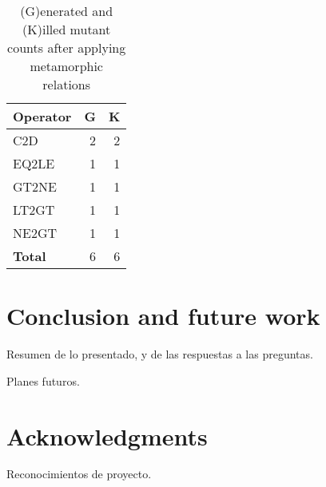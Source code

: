 \begin{table}
    \centering
    \begin{tabular}{lrr}
    \toprule
    \textbf{Operator} & \textbf{G} &  \textbf{K} \\
    \midrule
C2D         & 2 & 2 \\
EQ2LE   & 1     & 1 \\
GT2NE   & 1     & 1 \\
LT2GT   & 1     & 1 \\
NE2GT   & 1     & 1 \\

    \midrule
    \textbf{Total} & 6 & 6  \\
    \bottomrule
    \end{tabular}
    \caption{(G)enerated and (K)illed mutant counts after applying metamorphic relations}
    \label{tab:mutant-counts2}
\end{table}






\section{Conclusion and future work}

Resumen de lo presentado, y de las respuestas a las preguntas.

Planes futuros.

\section*{Acknowledgments}

Reconocimientos de proyecto.



\appendix



